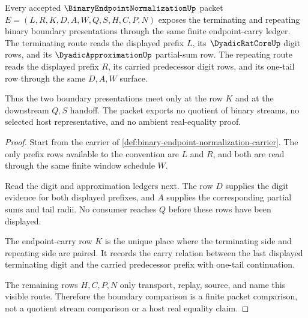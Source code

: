\begin{theorem}
\label{thm:binary-endpoint-normalization-dual-prefix-boundary}
Every accepted $\BinaryEndpointNormalizationUp$ packet $E=(L,R,K,D,A,W,Q,S,H,C,P,N)$ exposes the terminating and repeating binary boundary presentations through the same finite endpoint-carry ledger. The terminating route reads the displayed prefix $L$, its $\DyadicRatCoreUp$ digit rows, and its $\DyadicApproximationUp$ partial-sum row. The repeating route reads the displayed prefix $R$, its carried predecessor digit rows, and its one-tail row through the same $D,A,W$ surface.

Thus the two boundary presentations meet only at the row $K$ and at the downstream $Q,S$ handoff. The packet exports no quotient of binary streams, no selected host representative, and no ambient real-equality proof.
\end{theorem}
\begin{proof}
Start from the carrier of \autoref{def:binary-endpoint-normalization-carrier}. The only prefix rows available to the convention are $L$ and $R$, and both are read through the same finite window schedule $W$.

Read the digit and approximation ledgers next. The row $D$ supplies the digit evidence for both displayed prefixes, and $A$ supplies the corresponding partial sums and tail radii. No consumer reaches $Q$ before these rows have been displayed.

The endpoint-carry row $K$ is the unique place where the terminating side and repeating side are paired. It records the carry relation between the last displayed terminating digit and the carried predecessor prefix with one-tail continuation.

The remaining rows $H,C,P,N$ only transport, replay, source, and name this visible route. Therefore the boundary comparison is a finite packet comparison, not a quotient stream comparison or a host real equality claim.
\end{proof}


